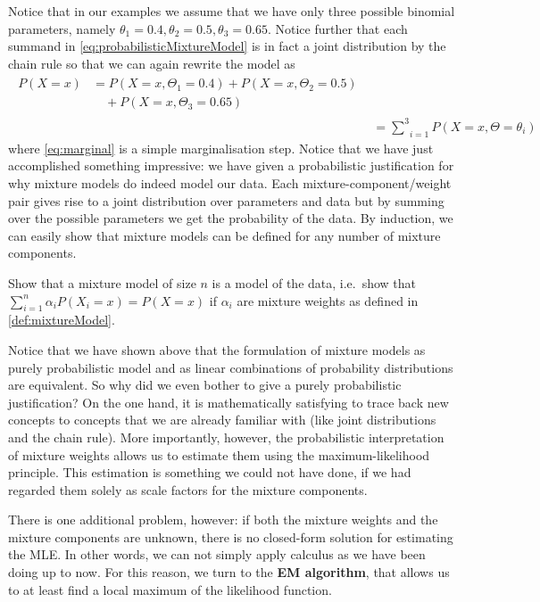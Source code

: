 Notice that in our examples we assume that we have only three possible binomial parameters, namely $ \theta_{1} = 0.4, \theta_{2} = 0.5, \theta_{3} = 0.65 $. 
Notice further that each summand
in \eqref{eq:probabilisticMixtureModel} is in fact a joint distribution by the chain rule so that we can again rewrite the model as
\begin{align}
\begin{split}\label{eq:marginal}
P(X=x) &= P(X=x,\Theta_{1}=0.4) + P(X=x,\Theta_{2}=0.5)  \\
&\quad + P(X=x,\Theta_{3}=0.65)
\end{split} \\
&= \underset{i=1}{\overset{3}{{\sum}}} P(X=x,\Theta=\theta_{i}) \nonumber
\end{align}
where \eqref{eq:marginal} is a simple marginalisation step. Notice that we have just accomplished something impressive: we have given a probabilistic justification
for why mixture models do indeed model our data. Each mixture-component/weight pair gives rise to a joint distribution over parameters and data but by summing over the 
possible parameters we get the probability of the data. By induction, we can easily show that mixture models can be defined for any number of mixture components.

\begin{Exercise}
Show that a mixture model of size $ n $ is a model of the data, i.e.\ show that $  \sum_{i=1}^n \alpha_{i}P(X_i=x) = P(X=x) $  if $ \alpha_{i} $ are mixture weights as 
defined in \eqref{def:mixtureModel}.
\end{Exercise}

Notice that we have shown above that the formulation of mixture models as purely probabilistic model and as linear combinations of probability distributions are
equivalent. So why did we even bother to give a purely probabilistic justification? On the one hand, it is mathematically satisfying to trace back new concepts
to concepts that we are already familiar with (like joint distributions and the chain rule). More importantly, however, the probabilistic interpretation of mixture
weights allows us to estimate them using the maximum-likelihood principle. This estimation is something we could not have done, if we had regarded them solely as scale factors
for the mixture components. 

There is one additional problem, however: if both the mixture weights and the mixture components are unknown, there is no closed-form solution for estimating the
MLE. In other words, we can not simply apply calculus as we have been doing up to now. For this reason, we turn to the \textbf{EM algorithm}, that allows
us to at least find a local maximum of the likelihood function.


